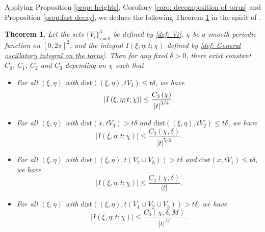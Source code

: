 \documentclass[12pt]{amsart}
\newtheorem{theorem}{Theorem}[section]
\begin{document}
Applying Proposition \ref{prop: heights}, Corollary \ref{coro: decomposition of torus} and Proposition \ref{prop:fast decay}, we deduce the following Theorem \ref{theorem: POU+decay} in the spirit of \cite[Theorem 2.4]{BG17}.
\begin{theorem}\label{theorem: POU+decay}
    Let the sets $\{V_{i}\}_{i=0}^{3}$ be defined by \eqref{def: Vi}, $\chi$ be a smooth periodic function on $\left[0,2\pi\right]^{2}$, and the integral $I\left(\xi,\eta;t;\chi\right)$ defined by \eqref{def: General oscillatory integral on the torus}. Then for any fixed $\delta>0$, there exist constant $C_{0}$, $C_{1}$, $C_{2}$ and $C_{3}$ depending on $\chi$ such that
    \begin{itemize}
        \item For all $\left(\xi,\eta\right)$ with $\mathrm{dist}\left(\left(\xi,\eta\right),tV_{3}\right)\leq t\delta$, we have
            \begin{equation}\label{eq:A_{3} decay}
                \left|I\left(\xi,\eta;t;\chi\right)\right|\leq\frac{C_{3}\left(\chi\right)}{\left|t\right|^{3/4}}.
            \end{equation}
        \item For all $\left(\xi,\eta\right)$ with $\mathrm{dist}\left(x,tV_{3}\right)>t\delta$ and $\mathrm{dist}\left(\left(\xi,\eta\right),tV_{2}\right)\leq t\delta$, we have
            \begin{equation}
                \left|I\left(\xi,\eta;t;\chi\right)\right|\leq\frac{C_{2}\left(\chi,\delta\right)}{\left|t\right|^{5/6}}.
            \end{equation}
        \item For all $\left(\xi,\eta\right)$ with $\mathrm{dist}\left(\left(\xi,\eta\right),t\left(V_{2}\cup V_{3}\right)\right)> t\delta$ and $\mathrm{dist}\left(x,tV_{1}\right)\leq t\delta$, we have
            \begin{equation}
                \left|I\left(\xi,\eta;t;\chi\right)\right|\leq\frac{C_{1}\left(\chi,\delta\right)}{\left|t\right|}.
            \end{equation}
        \item For all $\left(\xi,\eta\right)$ with $\mathrm{dist}\left(\left(\xi,\eta\right),t\left(V_{1}\cup V_{2}\cup V_{3}\right)\right)>t\delta$, we have
            \begin{equation}
                \left|I\left(\xi,\eta;t;\chi\right)\right|\leq\frac{C_{0}\left(\chi,\delta,M\right)}{\left|t\right|^{M}}.
            \end{equation}
    \end{itemize}
\end{theorem}
\end{document}
